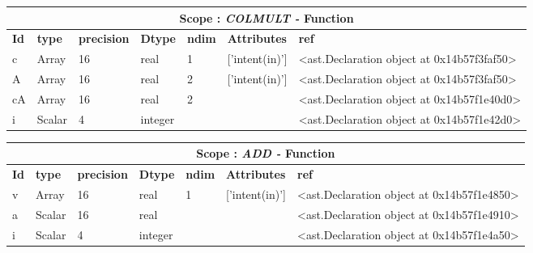 \documentclass{report}
\begin{document}
\begin{center}
\begin{longtable}{|p{3.5cm}|p{1.5cm}|p{1.5cm}|p{1.5cm}|p{1cm}|p{2cm}|p{4cm}| }
\hline
\multicolumn{7}{|c|}{\textbf{Scope : \qquad}  \textbf{\textit{COLMULT - }Function}}\\ 
\hline
\textbf{Id} & \textbf{type} & \textbf{precision} & \textbf{Dtype} & \textbf{ndim} & \textbf{Attributes} & \textbf{ref} \\\hline

c & Array & 16 & real & 1 & ['intent(in)'] & <ast.Declaration object at 0x14b57f3faf50> \\\hline

A & Array & 16 & real & 2 & ['intent(in)'] & <ast.Declaration object at 0x14b57f3faf50> \\\hline

cA & Array & 16 & real & 2 &  & <ast.Declaration object at 0x14b57f1e40d0> \\\hline

i & Scalar & 4 & integer &  &  & <ast.Declaration object at 0x14b57f1e42d0> \\\hline

\end{longtable}
\end{center}

 \vspace{1cm}

\begin{center}
\begin{longtable}{|p{3.5cm}|p{1.5cm}|p{1.5cm}|p{1.5cm}|p{1cm}|p{2cm}|p{4cm}| }
\hline
\multicolumn{7}{|c|}{\textbf{Scope : \qquad}  \textbf{\textit{ADD - }Function}}\\ 
\hline
\textbf{Id} & \textbf{type} & \textbf{precision} & \textbf{Dtype} & \textbf{ndim} & \textbf{Attributes} & \textbf{ref} \\\hline

v & Array & 16 & real & 1 & ['intent(in)'] & <ast.Declaration object at 0x14b57f1e4850> \\\hline

a & Scalar & 16 & real &  &  & <ast.Declaration object at 0x14b57f1e4910> \\\hline

i & Scalar & 4 & integer &  &  & <ast.Declaration object at 0x14b57f1e4a50> \\\hline

\end{longtable}
\end{center}
\end{document}
